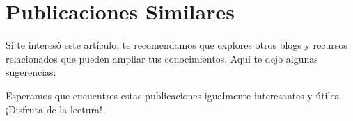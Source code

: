 \documentclass[
  jou,
  floatsintext,
  longtable,
  a4paper,
  nolmodern,
  notxfonts,
  notimes,
  12pt,
  colorlinks=true,linkcolor=blue,citecolor=blue,urlcolor=blue]{apa7}
\begin{document}
\section{Publicaciones Similares}\label{publicaciones-similares}

Si te interesó este artículo, te recomendamos que explores otros blogs y
recursos relacionados que pueden ampliar tus conocimientos. Aquí te dejo
algunas sugerencias:

Esperamos que encuentres estas publicaciones igualmente interesantes y
útiles. ¡Disfruta de la lectura!
\end{document}
